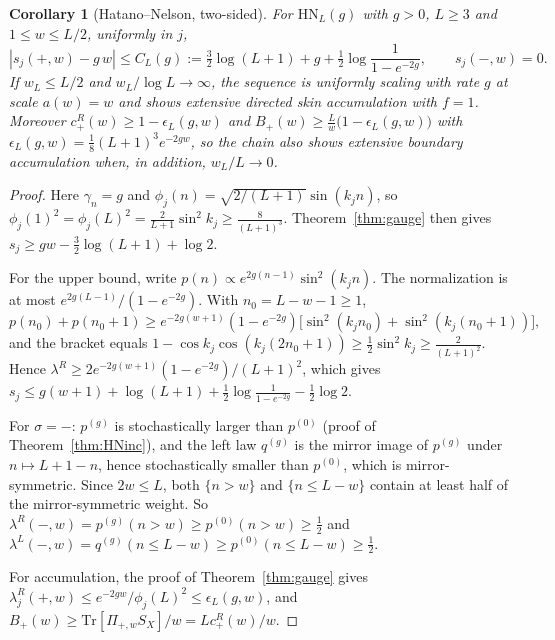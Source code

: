 \documentclass[11pt]{article}
\newtheorem{corollary}[theorem]{Corollary}
\theoremstyle{definition}
\theoremstyle{remark}
\newcommand{\Tr}{\mathrm{Tr}}
\begin{document}
\begin{corollary}[Hatano--Nelson, two-sided]\label{cor:HN}
For $\mathrm{HN}_L(g)$ with $g>0$, $L\ge3$ and $1\le w\le L/2$, uniformly in $j$,
\[
|s_j(+,w)-g\,w|\le C_L(g):=\tfrac32\log(L+1)+g+\tfrac12\log\frac{1}{1-e^{-2g}},\qquad s_j(-,w)=0 .
\]
If $w_L\le L/2$ and $w_L/\log L\to\infty$, the sequence is uniformly scaling with rate $g$ at scale $a(w)=w$ and shows extensive directed skin accumulation with $f=1$. Moreover $c^R_+(w)\ge1-\epsilon_L(g,w)$ and $B_+(w)\ge\frac Lw\bigl(1-\epsilon_L(g,w)\bigr)$ with $\epsilon_L(g,w)=\frac18(L+1)^3e^{-2gw}$, so the chain also shows extensive boundary accumulation when, in addition, $w_L/L\to0$.
\end{corollary}
\begin{proof}
Here $\gamma_n=g$ and $\phi_j(n)=\sqrt{2/(L+1)}\sin(k_jn)$, so $\phi_j(1)^2=\phi_j(L)^2=\frac{2}{L+1}\sin^2k_j\ge\frac{8}{(L+1)^3}$. Theorem~\ref{thm:gauge} then gives $s_j\ge gw-\frac32\log(L+1)+\log2$.

For the upper bound, write $p(n)\propto e^{2g(n-1)}\sin^2(k_jn)$. The normalization is at most $e^{2g(L-1)}/(1-e^{-2g})$. With $n_0=L-w-1\ge1$,
\[
p(n_0)+p(n_0+1)\ge e^{-2g(w+1)}(1-e^{-2g})\bigl[\sin^2(k_jn_0)+\sin^2(k_j(n_0+1))\bigr],
\]
and the bracket equals $1-\cos k_j\cos(k_j(2n_0+1))\ge\frac12\sin^2k_j\ge\frac2{(L+1)^2}$. Hence $\lambda^R\ge2e^{-2g(w+1)}(1-e^{-2g})/(L+1)^2$, which gives $s_j\le g(w+1)+\log(L+1)+\frac12\log\frac1{1-e^{-2g}}-\frac12\log2$.

For $\sigma=-$: $p^{(g)}$ is stochastically larger than $p^{(0)}$ (proof of Theorem~\ref{thm:HNinc}), and the left law $q^{(g)}$ is the mirror image of $p^{(g)}$ under $n\mapsto L+1-n$, hence stochastically smaller than $p^{(0)}$, which is mirror-symmetric. Since $2w\le L$, both $\{n>w\}$ and $\{n\le L-w\}$ contain at least half of the mirror-symmetric weight. So $\lambda^R(-,w)=p^{(g)}(n>w)\ge p^{(0)}(n>w)\ge\frac12$ and $\lambda^L(-,w)=q^{(g)}(n\le L-w)\ge p^{(0)}(n\le L-w)\ge\frac12$.

For accumulation, the proof of Theorem~\ref{thm:gauge} gives $\lambda^R_j(+,w)\le e^{-2gw}/\phi_j(L)^2\le\epsilon_L(g,w)$, and $B_+(w)\ge\Tr[\Pi_{+,w}S_X]/w=Lc^R_+(w)/w$.
\end{proof}
\end{document}
